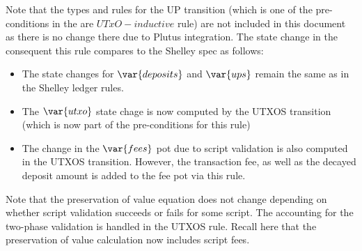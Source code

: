 Note that the types and rules for the UP transition (which is one of the
pre-conditions in the are $UTxO-inductive$ rule) are not included
in this document as there is no change there due to Plutus integration.
The state change in the consequent this rule compares to the Shelley spec
as follows:

\begin{itemize}
  \item The state changes for $\var{deposits}$ and $\var{ups}$ remain
  the same as in the Shelley ledger rules.

  \item The $\var{utxo}$ state chage is now computed by the UTXOS transition
  (which is now part of the pre-conditions for this rule)

  \item The change in the $\var{fees}$ pot due to script validation is
  also computed in the UTXOS transition. However, the transaction fee, as well
  as the decayed deposit amount is added to the fee pot via this rule.

\end{itemize}

  Note that the preservation of value equation does not change depending on
  whether script validation succeeds or
  fails for some script. The accounting for the two-phase validation
  is handled in the UTXOS rule. Recall here that the preservation of value
  calculation now includes script fees.


